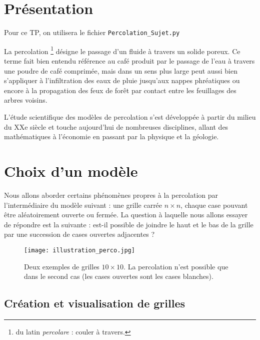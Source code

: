 
\setcounter{numques}{0}
\section{Présentation}
Pour ce TP, on utilisera le fichier \texttt{Percolation\_Sujet.py}

La percolation \footnote{du latin \emph{percolare} : couler à travers.} désigne le passage d'un fluide à
travers un solide poreux. Ce terme fait bien entendu référence au café 
produit par le passage de l'eau à travers une poudre de café comprimée,
mais dans un sens plus large peut aussi bien s'appliquer à
l'infiltration des eaux de pluie jusqu'aux nappes phréatiques ou encore
à la propagation des feux de forêt par contact entre les feuillages des
arbres voisins.

L'étude scientifique des modèles de percolation s'est développée à
partir du milieu du XXe siècle et touche aujourd'hui de nombreuses
disciplines, allant des mathématiques à l'économie en passant par la
physique et la géologie.

\section{Choix d'un modèle}\label{choix-dun-modele}


Nous allons aborder certains phénomènes propres à la percolation par
l'intermédiaire du modèle suivant : une grille carrée $n\times n$,
chaque case pouvant être aléatoirement ouverte ou fermée.
La question à laquelle nous
allons essayer de répondre est la suivante : est-il possible de joindre
le haut et le bas de la grille par une succession de cases ouvertes
adjacentes ?

\begin{figure}[H]
\begin{center}
\texttt{[image: illustration\_perco.jpg]}
\caption{Deux exemples de grilles $10\times10$. La percolation
n'est possible que dans le second cas (les cases ouvertes sont les cases
blanches). \label{fig1}}
\end{center}
\end{figure}



\subsection*{Création et visualisation de grilles}


